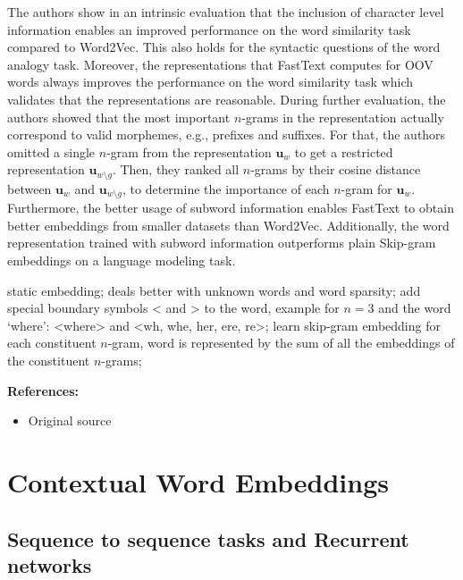 \documentclass[11pt, a4paper]{amsart}
\begin{document}
The authors show in an intrinsic evaluation that the inclusion of character level information enables an improved performance on the word similarity task compared to Word2Vec. This also holds for the syntactic questions of the word analogy task. Moreover, the representations that FastText computes for OOV words always improves the performance on the word similarity task which validates that the representations are reasonable. During further evaluation, the authors showed that the most important $n$-grams in the representation actually correspond to valid morphemes, e.g., prefixes and suffixes. For that, the authors omitted a single $n$-gram from the representation $\textbf{u}_w$ to get a restricted representation $\textbf{u}_{w\setminus g}$. Then, they ranked all $n$-grams by their cosine distance between $\textbf{u}_w$ and $\textbf{u}_{w\setminus g}$, to determine the importance of each $n$-gram for $\textbf{u}_w$. Furthermore, the better usage of subword information enables FastText to obtain better embeddings from smaller datasets than Word2Vec. Additionally, the word representation trained with subword information outperforms plain Skip-gram embeddings on a language modeling task.

{
	\color{blue}
	
	static embedding;
	deals better with unknown words and word sparsity;
	add special boundary symbols < and > to the word,
	example for $n=3$ and the word `where':
	<where> and <wh, whe, her, ere, re>;
	learn skip-gram embedding for each constituent $n$-gram, word is represented by the sum of all the embeddings of the constituent $n$-grams;
} %

\noindent \textbf{References:}
\begin{itemize}
	\item Original source \cite{DBLP:journals/corr/BojanowskiGJM16}
\end{itemize}


\section{Contextual Word Embeddings}
\label{sec:contextual_word_embeddings}

\subsection{Sequence to sequence tasks and Recurrent networks}
\end{document}
